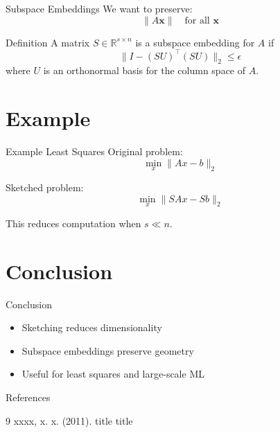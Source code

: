 \documentclass[10pt]{beamer}
\begin{document}
\begin{frame}{Subspace Embeddings}
We want to preserve:
\[
\|A \bm{x}\| \quad \text{for all } \bm{x}
\]

    \begin{block}{Definition}
    A matrix $S \in \mathbb{R}^{s \times n}$ is a subspace embedding for $A$ if
    \[
    \| I - (SU)^\top (SU) \|_2 \le \epsilon
    \]
    where $U$ is an orthonormal basis for the column space of $A$.
    \end{block}
\end{frame}

\section{Example}

\begin{frame}{Example Least Squares}
Original problem:
\[
\min_x \|Ax - b\|_2
\]

Sketched problem:
\[
\min_x \|SAx - Sb\|_2
\]

This reduces computation when $s \ll n$.
\end{frame}

\section{Conclusion}

\begin{frame}{Conclusion}
\begin{itemize}
    \item Sketching reduces dimensionality
    \item Subspace embeddings preserve geometry
    \item Useful for least squares and large-scale ML
\end{itemize}
\end{frame}

\begin{frame}{References}
\begin{thebibliography}{9}
xxxx, x. x. (2011).
title title
\end{thebibliography}
\end{frame}
\end{document}
